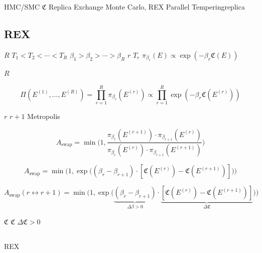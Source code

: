 \documentclass[12pt,a4paper]{article}
\theoremstyle{plain}
\theoremstyle{definition}
\newcommand{\Cercis}{\mathfrak{C}}
\begin{document}
 HMC/SMC  $\Cercis$ 
\textbf{}Replica Exchange Monte Carlo, REX
Parallel Temperingreplica


\subsection{REX }

 $R$  $T_1 < T_2 < \cdots < T_R$
$\beta_1 > \beta_2 > \cdots > \beta_R$ $r$  $T_r$ 
 $\pi_{\beta_r}(E) \propto \exp(-\beta_r \Cercis(E))$

\textbf{}  $R$ 

\begin{equation}\label{eq:rex_joint}
    \Pi(E^{(1)}, \ldots, E^{(R)}) = \prod_{r=1}^R \pi_{\beta_r}(E^{(r)})
        \propto \prod_{r=1}^R \exp(-\beta_r \Cercis(E^{(r)}))
\end{equation}

\textbf{}  $r$  $r+1$  Metropolis 

\begin{equation}\label{eq:swap_prob}
    A_{\text{swap}} = \min\!\Bigg(1,
        \frac{\pi_{\beta_r}(E^{(r+1)}) \cdot \pi_{\beta_{r+1}}(E^{(r)})}
             {\pi_{\beta_r}(E^{(r)}) \cdot \pi_{\beta_{r+1}}(E^{(r+1)})}
    \Bigg)
\end{equation}



\begin{equation}\label{eq:swap_simplified}
    A_{\text{swap}} = \min\!\Big(1,
        \exp\!\big( (\beta_r - \beta_{r+1}) \cdot [\Cercis(E^{(r)}) - \Cercis(E^{(r+1)})] \big)
    \Big)
\end{equation}

\begin{keyeq}
\textbf{}
\begin{equation}
    A_{\text{swap}}(r \leftrightarrow r+1) =
    \min\!\Bigg(1, \exp\!\Big(
        \underbrace{(\beta_r - \beta_{r+1})}_{\Delta\beta > 0}
        \cdot
        \underbrace{[\Cercis(E^{(r)}) - \Cercis(E^{(r+1)})]}_{\Delta \Cercis}
    \Big)\Bigg)
\end{equation}

 $\Cercis$ $\Cercis$
$\Delta\Cercis > 0$\textbf{}

\end{keyeq}

\subsection{}

 REX 
\end{document}
